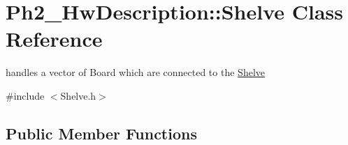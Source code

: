 \hypertarget{class_ph2___hw_description_1_1_shelve}{\section{Ph2\-\_\-\-Hw\-Description\-:\-:Shelve Class Reference}
\label{class_ph2___hw_description_1_1_shelve}
}


handles a vector of Board which are connected to the \hyperlink{class_ph2___hw_description_1_1_shelve}{Shelve}  




{\ttfamily \#include $<$Shelve.\-h$>$}

\subsection*{Public Member Functions}
